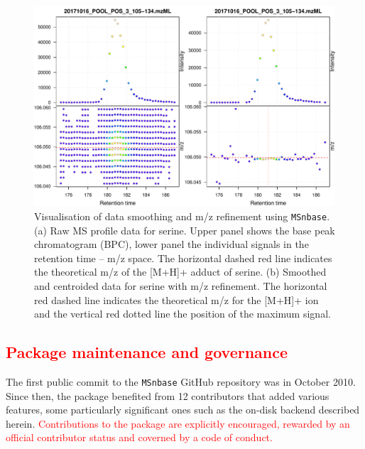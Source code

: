\documentclass[journal=jacsat,manuscript=article]{achemso}\usepackage[]{graphicx}\usepackage[]{color}
\begin{document}
\begin{figure}
  \centering
  \includegraphics[width=\linewidth]{./figure/centroiding.pdf}
  \caption{Visualisation of data smoothing and m/z refinement using
    \texttt{MSnbase}. (a) Raw MS profile data for serine. Upper panel
    shows the base peak chromatogram (BPC), lower panel the individual
    signals in the retention time -- m/z space. The horizontal dashed
    red line indicates the theoretical m/z of the [M+H]+ adduct of
    serine. (b) Smoothed and centroided data for serine with m/z
    refinement. The horizontal red dashed line indicates the
    theoretical m/z for the [M+H]+ ion and the vertical red dotted
    line the position of the maximum signal. }
  \label{fig:cent}
\end{figure}


\subsection{\textcolor{red}{Package maintenance and governance}}

The first public commit to the \texttt{MSnbase} GitHub repository was
in October 2010. Since then, the package benefited from 12
contributors\cite{contribs} that added various features, some
particularly significant ones such as the on-disk backend described
herein. \textcolor{red}{Contributions to the package are explicitly
  encouraged, rewarded by an official contributor status and coverned
  by a code of conduct.}
\end{document}
